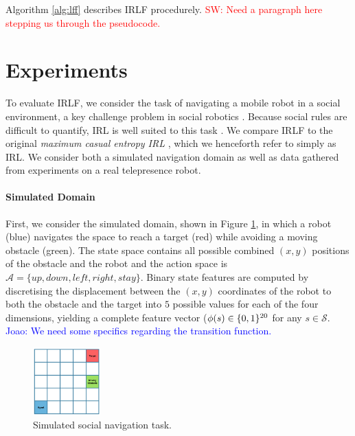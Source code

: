 \documentclass[letterpaper]{article}
\newcommand{\sw}[1]{\textcolor{red}{SW: #1}}
\newcommand{\jm}[1]{\textcolor{blue}{Joao: #1}}
\newcommand{\sw}[1]{}
\newcommand{\jm}[1]{}
\begin{document}
Algorithm \ref{alg:lff} describes IRLF procedurely.  \sw{Need a paragraph here stepping us through the pseudocode.}



\section{Experiments}

To evaluate IRLF, we consider the task of navigating a mobile robot in a social environment, a key challenge problem in social robotics \cite{pacchierotti2006embodied}. Because social rules are difficult to quantify, IRL is well suited to this task \cite{henry2010learning,vasquez2014inverse}.  We compare IRLF to the original \emph{maximum casual entropy IRL} \cite{ziebart2008maximum}, which we henceforth refer to simply as IRL.  We  consider both a simulated navigation domain as well as data gathered from experiments on a real telepresence robot.
\vspace{-4mm}
\paragraph{Simulated Domain}

First, we consider the simulated domain, shown in Figure \ref{fig:gridworld}, in which a robot (blue) navigates the space to reach a target (red) while avoiding a moving
obstacle (green). The state space contains all possible combined $(x,y)$ positions of the obstacle and the robot and the action space is $\mathcal{A} = \{up,down,left,right,stay\}$. Binary state features are computed by discretising the displacement between the $(x,y)$ coordinates of the robot to both the obstacle and the target into $5$ possible values for each of the four dimensions, yielding a complete feature vector ($\phi(s)\in\mathbb \{0,1\}^{20}$ for any $s\in\mathcal{S}$. \jm{We need some specifics regarding the transition function.}

\begin{figure} 
\centering
    \includegraphics[width=0.23\textwidth]{images/gridworld.png}
  \caption{Simulated social navigation task.} \label{fig:gridworld}
\end{figure}
\end{document}
